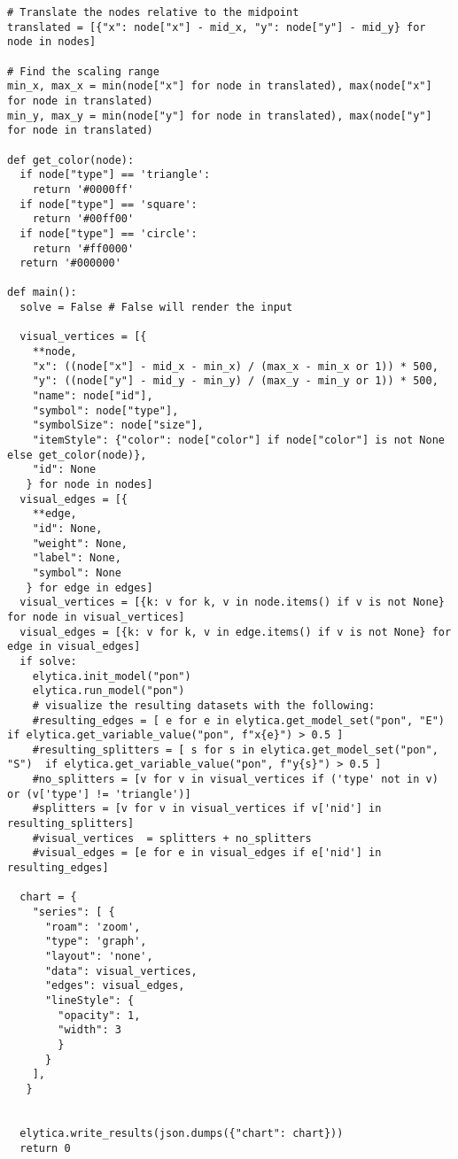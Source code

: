 \documentclass{article}
\begin{document}
\begin{lstlisting}[style=custompython, caption=Python Code for PON Model]
# Translate the nodes relative to the midpoint
translated = [{"x": node["x"] - mid_x, "y": node["y"] - mid_y} for node in nodes]

# Find the scaling range
min_x, max_x = min(node["x"] for node in translated), max(node["x"] for node in translated)
min_y, max_y = min(node["y"] for node in translated), max(node["y"] for node in translated)

def get_color(node):
  if node["type"] == 'triangle':
    return '#0000ff'
  if node["type"] == 'square':
    return '#00ff00'
  if node["type"] == 'circle':
    return '#ff0000'
  return '#000000'

def main():
  solve = False # False will render the input

  visual_vertices = [{
    **node, 
    "x": ((node["x"] - mid_x - min_x) / (max_x - min_x or 1)) * 500,
    "y": ((node["y"] - mid_y - min_y) / (max_y - min_y or 1)) * 500,
    "name": node["id"],
    "symbol": node["type"],
    "symbolSize": node["size"],
    "itemStyle": {"color": node["color"] if node["color"] is not None else get_color(node)},
    "id": None
   } for node in nodes]
  visual_edges = [{
    **edge, 
    "id": None,
    "weight": None,
    "label": None,
    "symbol": None
   } for edge in edges]
  visual_vertices = [{k: v for k, v in node.items() if v is not None} for node in visual_vertices]
  visual_edges = [{k: v for k, v in edge.items() if v is not None} for edge in visual_edges]
  if solve:
    elytica.init_model("pon")
    elytica.run_model("pon")
    # visualize the resulting datasets with the following:
    #resulting_edges = [ e for e in elytica.get_model_set("pon", "E")  if elytica.get_variable_value("pon", f"x{e}") > 0.5 ]
    #resulting_splitters = [ s for s in elytica.get_model_set("pon", "S")  if elytica.get_variable_value("pon", f"y{s}") > 0.5 ]
    #no_splitters = [v for v in visual_vertices if ('type' not in v) or (v['type'] != 'triangle')]
    #splitters = [v for v in visual_vertices if v['nid'] in resulting_splitters]
    #visual_vertices  = splitters + no_splitters
    #visual_edges = [e for e in visual_edges if e['nid'] in resulting_edges]

  chart = {
    "series": [ {
      "roam": 'zoom',
      "type": 'graph',
      "layout": 'none',
      "data": visual_vertices,
      "edges": visual_edges,
      "lineStyle": {
        "opacity": 1,
        "width": 3
        }
      }
    ],
   }


  elytica.write_results(json.dumps({"chart": chart})) 
  return 0

\end{lstlisting}
\end{document}
